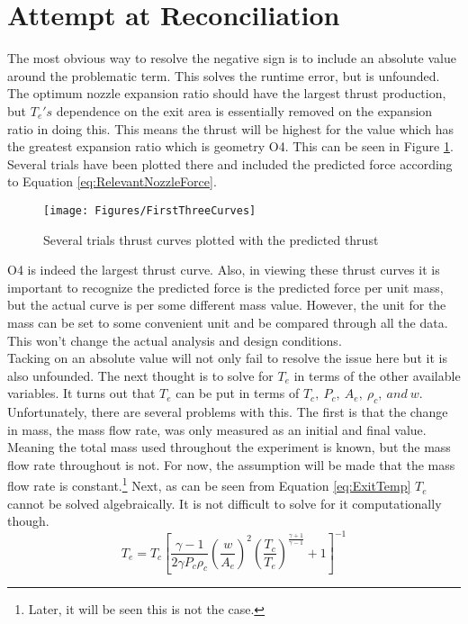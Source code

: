 \section{Attempt at Reconciliation}
The most obvious way to resolve the negative sign is to include an absolute value around the problematic term. This solves the runtime error, but is unfounded. The optimum nozzle expansion ratio should have the largest thrust production, but  $T_e's$ dependence on the exit area is essentially removed on the expansion ratio in doing this. This means the thrust will be highest for the value which has the greatest expansion ratio which is geometry O4. This can be seen in Figure \ref{fig:FirstThreeCurves}. Several trials have been plotted there and included the predicted force according to Equation \ref{eq:RelevantNozzleForce}.
\begin{figure}[h!]
\centering
\texttt{[image: Figures/FirstThreeCurves]}
\caption{Several trials thrust curves plotted with the predicted thrust}
\label{fig:FirstThreeCurves}
\end{figure}
O4 is indeed the largest thrust curve. Also, in viewing these thrust curves it is important to recognize the predicted force is the predicted force per unit mass, but the actual curve is per some different mass value. However, the unit for the mass can be set to some convenient unit and be compared through all the data. This won't change the actual analysis and design conditions.\\
Tacking on an absolute value will not only fail to resolve the issue here but it is also unfounded. The next thought is to solve for $T_e$ in terms of the other available variables. It turns out that $T_e$ can be put in terms of $T_c,\ P_c,\ A_e,\ \rho_c,\ and\ w$. Unfortunately, there are several problems with this. The first is that the change in mass, the mass flow rate, was only measured as an initial and final value. Meaning the total mass used throughout the experiment is known, but the mass flow rate throughout is not. For now, the assumption will be made that the mass flow rate is constant.\footnote{Later, it will be seen this is not the case.} Next, as can be seen from Equation \ref{eq:ExitTemp} $T_e$ cannot be solved algebraically. It is not difficult to solve for it computationally though. 
\begin{equation}\label{eq:ExitTemp}
T_e = T_c\left[\frac{\gamma -1}{2\gamma P_c \rho_c} \left(\frac{w}{A_e}\right)^2\left(\frac{T_c}{T_e}\right)^{\frac{\gamma+1}{\gamma-1}}+1\right]^{-1}
\end{equation}
